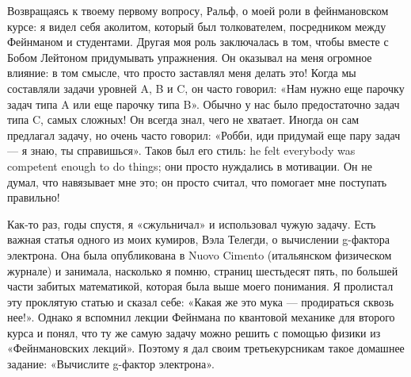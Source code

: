 \documentclass[11pt,oneside]{article}
\begin{document}
Возвращаясь к твоему первому вопросу, Ральф, о моей роли в фейнмановском курсе: я видел себя аколитом, который был толкователем, посредником между Фейнманом и студентами. Другая моя роль заключалась в том, чтобы вместе с Бобом Лейтоном придумывать упражнения. Он оказывал на меня огромное влияние: в том смысле, что просто заставлял меня делать это! Когда мы составляли задачи уровней A, B и C, он часто говорил: «Нам нужно еще парочку задач типа A или еще парочку типа B». Обычно у нас было предостаточно задач типа C, самых сложных! Он всегда знал, чего не хватает. Иногда он сам предлагал задачу, но очень часто говорил: «Робби, иди придумай еще пару задач --- я знаю, ты справишься». Таков был его стиль: he felt everybody was competent enough to do things; они просто нуждались в мотивации. Он не думал, что навязывает мне это; он просто считал, что помогает мне поступать правильно!\par



Как-то раз, годы спустя, я «сжульничал» и использовал чужую задачу. Есть важная статья одного из моих кумиров, Вэла Телегди, о вычислении g-фактора электрона. Она была опубликована в Nuovo Cimento (итальянском физическом журнале) и занимала, насколько я помню, страниц шестьдесят пять, по большей части забитых математикой, которая была выше моего понимания. Я пролистал эту проклятую статью и сказал себе: «Какая же это мука --- продираться сквозь нее!». Однако я вспомнил лекции Фейнмана по квантовой механике для второго курса и понял, что ту же самую задачу можно решить с помощью физики из «Фейнмановских лекций». Поэтому я дал своим третьекурсникам такое домашнее задание: «Вычислите g-фактор электрона».\par
\end{document}
